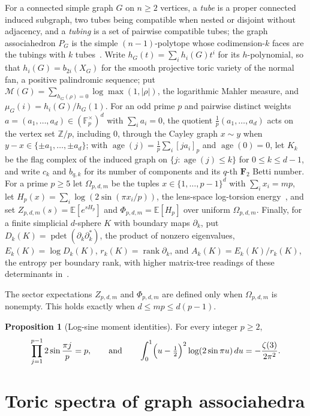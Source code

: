 \documentclass[11pt]{article}
\theoremstyle{definition}
\newcommand{\Z}{\mathbb Z}
\providecommand{\Z}{\mathbb Z}
\newtheorem{proposition}{Proposition}
\begin{document}
For a connected simple graph $G$ on $n\ge2$ vertices, a \emph{tube} is a proper connected induced subgraph, two tubes being compatible when nested or disjoint without adjacency, and a \emph{tubing} is a set of pairwise compatible tubes; the graph associahedron $P_G$ is the simple $(n-1)$-polytope whose codimension-$k$ faces are the tubings with $k$ tubes~\cite{PRW08}.  Write $h_G(t)=\sum_ih_i(G)t^i$ for its $h$-polynomial, so that $h_i(G)=b_{2i}(X_G)$ for the smooth projective toric variety of the normal fan, a positive palindromic sequence; put $\mathcal M(G)=\sum_{h_G(\rho)=0}\log\max(1,|\rho|)$, the logarithmic Mahler measure, and $\mu_G(i)=h_i(G)/h_G(1)$.  For an odd prime $p$ and pairwise distinct weights $a=(a_1,\ldots,a_d)\in(\mathbb F_p^\times)^d$ with $\sum_ia_i=0$, the quotient $\tfrac1p(a_1,\ldots,a_d)$ acts on the vertex set $\Z/p$, including $0$, through the Cayley graph $x\sim y$ when $y-x\in\{\pm a_1,\ldots,\pm a_d\}$; with $\operatorname{age}(j)=\tfrac1p\sum_i[ja_i]_p$ and $\operatorname{age}(0)=0$, let $K_k$ be the flag complex of the induced graph on $\{j:\operatorname{age}(j)\le k\}$ for $0\le k\le d-1$, and write $c_k$ and $b_{q,k}$ for its number of components and its $q$-th $\mathbf F_2$ Betti number.  For a prime $p\ge5$ let $\Omega_{p,d,m}$ be the tuples $x\in\{1,\ldots,p-1\}^d$ with $\sum_ix_i=mp$, let $H_p(x)=\sum_i\log(2\sin(\pi x_i/p))$, the lens-space log-torsion energy~\cite{NO92}, and set $Z_{p,d,m}(s)=\mathbb E[e^{sH_p}]$ and $\Phi_{p,d,m}=\mathbb E[H_p]$ over uniform $\Omega_{p,d,m}$.  Finally, for a finite simplicial $d$-sphere $K$ with boundary maps $\partial_k$, put $D_k(K)=\operatorname{pdet}(\partial_k\partial_k^{*})$, the product of nonzero eigenvalues, $E_k(K)=\log D_k(K)$, $r_k(K)=\operatorname{rank}\partial_k$, and $A_k(K)=E_k(K)/r_k(K)$, the entropy per boundary rank, with higher matrix-tree readings of these determinants in~\cite{DKM09,MMRW15}.

The sector expectations $Z_{p,d,m}$ and $\Phi_{p,d,m}$ are defined only when $\Omega_{p,d,m}$ is nonempty.  This holds exactly when $d\le mp\le d(p-1)$.

\begin{proposition}[Log-sine moment identities]\label{z:logsine}
For every integer $p\ge2$,
\[
\prod_{j=1}^{p-1}2\sin\frac{\pi j}{p}=p,
\qquad\text{and}\qquad
\int_0^1\Bigl(u-\tfrac12\Bigr)^2\log(2\sin\pi u)\,du=-\frac{\zeta(3)}{2\pi^2}.
\]
\end{proposition}

\section{Toric spectra of graph associahedra}
\end{document}
